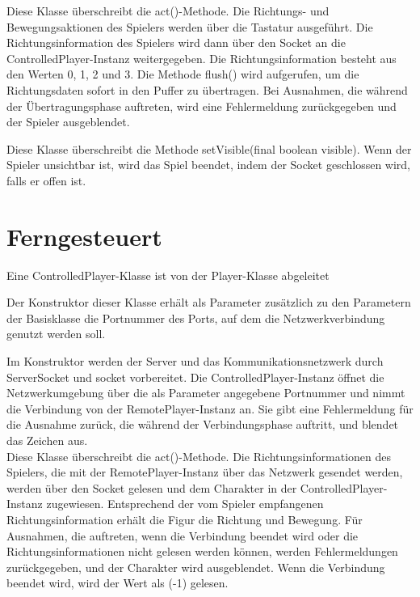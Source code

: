 \documentclass{pi1}
\begin{document}


Diese Klasse überschreibt die act()-Methode. 
Die Richtungs- und Bewegungsaktionen des Spielers werden über die Tastatur ausgeführt. Die Richtungsinformation des Spielers wird dann über den Socket an die ControlledPlayer-Instanz weitergegeben. Die Richtungsinformation besteht aus den Werten 0, 1, 2 und 3. Die Methode flush() wird aufgerufen, um die Richtungsdaten sofort in den Puffer zu übertragen. Bei Ausnahmen, die während der Übertragungsphase auftreten, wird eine Fehlermeldung zurückgegeben und der Spieler ausgeblendet.




Diese Klasse überschreibt die Methode setVisible(final boolean visible). 
Wenn der Spieler unsichtbar ist, wird das Spiel beendet, indem der Socket geschlossen wird, falls er offen ist.




\section{Ferngesteuert}

Eine ControlledPlayer-Klasse ist von der Player-Klasse abgeleitet



Der Konstruktor dieser Klasse erhält als Parameter zusätzlich zu den Parametern der Basisklasse die Portnummer des Ports, auf dem die Netzwerkverbindung genutzt werden soll.



Im Konstruktor werden der Server und das Kommunikationsnetzwerk durch ServerSocket und socket vorbereitet. Die ControlledPlayer-Instanz öffnet die Netzwerkumgebung über die als Parameter angegebene Portnummer und nimmt die Verbindung von der RemotePlayer-Instanz an. Sie gibt eine Fehlermeldung für die Ausnahme zurück, die während der Verbindungsphase auftritt, und blendet das Zeichen aus.\\



Diese Klasse überschreibt die act()-Methode. 
Die Richtungsinformationen des Spielers, die mit der RemotePlayer-Instanz über das Netzwerk gesendet werden, werden über den Socket gelesen und dem Charakter in der ControlledPlayer-Instanz zugewiesen. Entsprechend der vom Spieler empfangenen Richtungsinformation erhält die Figur die Richtung und Bewegung. Für Ausnahmen, die auftreten, wenn die Verbindung beendet wird oder die Richtungsinformationen nicht gelesen werden können, werden Fehlermeldungen zurückgegeben, und der Charakter wird ausgeblendet. Wenn die Verbindung beendet wird, wird der Wert als (-1) gelesen.
\end{document}
